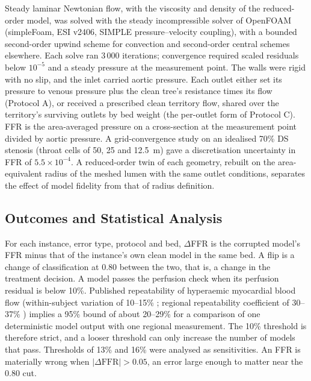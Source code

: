 \documentclass[journal]{IEEEtran}
\begin{document}
Steady laminar Newtonian flow, with the viscosity and density of the reduced-order model, was solved with the
steady incompressible solver of OpenFOAM (simpleFoam, ESI v2406, SIMPLE pressure--velocity coupling), with a
bounded second-order upwind scheme for convection and second-order central schemes elsewhere. Each solve ran
3\,000 iterations; convergence required scaled residuals below $10^{-5}$ and a steady pressure at the measurement
point. The walls were rigid with no slip, and the inlet carried aortic pressure. Each outlet either set its pressure
to venous pressure plus the clean tree's resistance times its flow (Protocol A), or received a prescribed clean
territory flow, shared over the territory's surviving outlets by bed weight (the per-outlet form of Protocol C). FFR
is the area-averaged pressure on a cross-section at the measurement point divided by aortic pressure. A
grid-convergence study on an idealised 70\% DS stenosis (throat cells of 50, 25 and 12.5~\textmu m) gave a
discretisation uncertainty in FFR of $5.5\times10^{-4}$. A reduced-order twin of each geometry, rebuilt on the
area-equivalent radius of the meshed lumen with the same outlet conditions, separates the effect of model fidelity
from that of radius definition.

\subsection{Outcomes and Statistical Analysis}
For each instance, error type, protocol and bed, $\Delta$FFR is the corrupted model's FFR minus that of the
instance's own clean model in the same bed. A flip is a change of classification at 0.80 between the two, that is,
a change in the treatment decision. A model passes the perfusion check when its perfusion residual is below 10\%.
Published repeatability of hyperaemic myocardial blood flow (within-subject variation of 10--15\% \cite{schindler2023}; regional repeatability coefficient of 30--37\% \cite{brown2018}) implies a 95\% bound of about 20--29\% for a comparison of one deterministic model output with one regional measurement. The 10\% threshold is therefore strict, and a looser
threshold can only increase the number of models that pass. Thresholds of 13\% and 16\% were analysed as
sensitivities. An FFR is materially wrong when $|\Delta\mathrm{FFR}| > 0.05$, an error large enough to matter near
the 0.80 cut.
\end{document}
